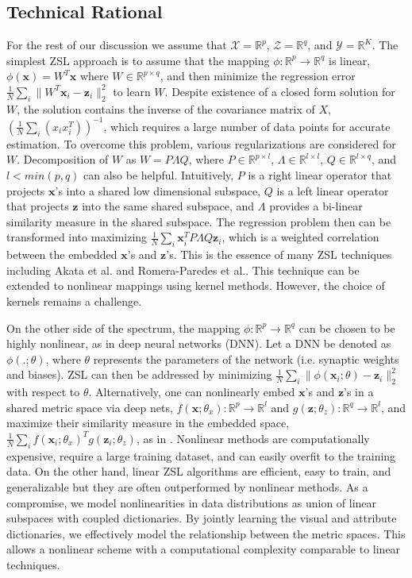 \documentclass[letterpaper]{article} %
\def\x{\mathbf{x}}
\def\z{\mathbf{z}}
\def\R{\mathbb{R}}
\begin{document}
\subsection{Technical Rational}

 For the rest of our discussion we assume that $\mathcal{X}=\R^p$, $\mathcal{Z}=\R^q$, and $\mathcal{Y}=\R^K$. The simplest ZSL approach is to assume that the mapping $\phi:\mathbb{R}^p\rightarrow \mathbb{R}^q$ is linear, $\phi(\x)=W^T\x$ where $W\in \R^{p\times q}$, and then minimize the regression error $\frac{1}{N}\sum_i \|W^T\x_i-\z_i\|^2_2$ to learn $W$. Despite existence of  a closed form solution for $W$, the solution contains the inverse of the covariance matrix of $X$, $(\frac{1}{N}\sum_i (x_ix_i^T))^{-1}$, which requires a large number of data points for accurate estimation. To overcome this problem, various regularizations are considered for $W$. Decomposition of $W$ as $W=P\Lambda Q$, where $P\in\R^{p\times l}$, $\Lambda\in\R^{l\times l}$, $Q\in\R^{l\times q}$, and $l<min(p,q)$ can also be helpful. Intuitively, $P$ is a right linear operator that projects $\x$'s into a shared low dimensional subspace, $Q$ is a left linear operator that projects  $\z$ into the same shared subspace, and $\Lambda$ provides a bi-linear similarity measure in the shared subspace. The  regression problem then can be transformed into maximizing $\frac{1}{N}\sum_i \x_i^TP\Lambda Q\z_i$, which is a weighted correlation between the embedded $\x$'s and $\z$'s. This is the essence of many ZSL techniques including Akata et al. \cite{akata2013label} and Romera-Paredes et al.\cite{romera2015embarrassingly}.  This technique  can be   extended to nonlinear mappings using  kernel methods. However, the choice of kernels remains  a challenge.

 On the other side of the spectrum, the mapping $\phi:\R^p\rightarrow \R^q$ can be chosen to be highly nonlinear, as in deep neural networks (DNN). Let a DNN be denoted as $\phi(.;\theta)$, where $\theta$ represents the parameters of the network (i.e. synaptic weights and biases). ZSL can then be addressed by minimizing $\frac{1}{N}\sum_i \|\phi(\x_i;\theta)-\z_i\|^2_2$ with respect to $\theta$. Alternatively, one can nonlinearly embed $\x$'s and $\z$'s in a shared metric space via deep nets, $f(\x;\theta_x):\R^p\rightarrow \R^l$ and $g(\z;\theta_z):\R^q\rightarrow \R^l$, and maximize their similarity measure in the embedded space, $\frac{1}{N}\sum_i f(\x_i;\theta_x)^T g(\z_i;\theta_z)$, as in \cite{lei2015predicting}.  Nonlinear methods  are computationally expensive, require a large training dataset, and can easily overfit to the training data. On the other hand, linear ZSL algorithms are efficient, easy to train, and generalizable but they are often outperformed by nonlinear methods.  As a compromise, we model nonlinearities in data distributions as union of linear subspaces with coupled dictionaries. By jointly learning the visual and attribute dictionaries, we effectively model the relationship between the metric spaces. This allows a nonlinear scheme with a computational complexity comparable to linear techniques.  
\end{document}
